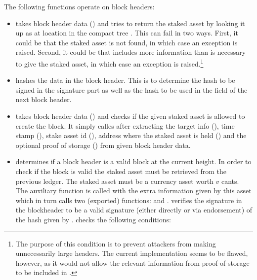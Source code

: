 The following functions operate on block headers:
\begin{itemize}
\item {} takes block header data ({})
and tries to return the staked asset by looking it up 
as {} at location {} in the compact tree {}.
This can fail in two ways.
First, it could be that the staked asset is not found, in which case an exception {} is raised.
Second, it could be that {} includes more information than is necessary to give the staked asset,
in which case an exception {} is raised.\footnote{The purpose of this condition is to prevent attackers from making unnecessarily large headers. The current implementation seems to be flawed, however, as it would not allow the relevant information from proof-of-storage to be included in {}.}
\item {} hashes the data in the block header. This is to determine
the hash to be signed in the signature part
as well as the hash to be used in the {} field of the next block header.
\item {} takes block header data ({})
and checks if the given staked asset is allowed to create the block.
It simply calles {} after
extracting the target info ({}), time stamp ({}),
stake asset id ({}),
address where the staked asset is held ({})
and the optional proof of storage ({})
from given block header data.
\item {} determines if a block header is a valid block at the current height.
In order to check if the block is valid the staked asset must be retrieved from
the previous ledger.
The staked asset must be a currency asset worth $v$ cants.
The auxiliary function {} is called with the extra information given by this asset
which in turn calls two (exported) functions:
{} and
{}.
{} verifies the signature 
in the blockheader to be a valid signature (either directly or via endorsement) of the hash given by {}.
{} checks the following conditions:
\begin{enumerate}

\end{enumerate}
\end{itemize}
